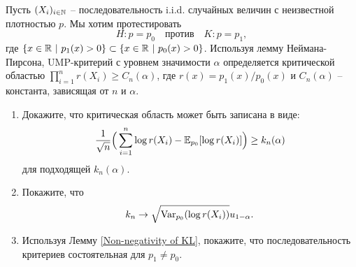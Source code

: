 \begin{exc}
	Пусть $(X_i)_{i \in \mathbb{N}}$ -- последовательность i.i.d. случайных величин с неизвестной плотностью $p$. Мы хотим протестировать
    \[ H:p = p_0 \quad \text{против} \quad K: p = p_1, \]
    где $\{x\in \mathbb{R}\ |\ p_1(x) > 0 \} \subset \{x \in \mathbb{R}\ |\ p_0(x) > 0 \} $. Используя лемму Неймана-Пирсона, UMP-критерий с уровнем значимости $\alpha$ определяется критической областью $\prod_{i=1}^n r(X_i) \geq C_n(\alpha)$, где $r(x) = p_1(x) / p_0(x)$ и $C_n(\alpha)$ -- константа, зависящая от $n$ и $\alpha$.
    \begin{enumerate}
        \item Докажите, что критическая область может быть записана в виде:
        \[ \frac{1}{\sqrt{n}}\Big( \sum_{i=1}^{n} \log r(X_i) - \mathbb{E}_{p_0}[\log r(X_i)] \Big) \geq k_n(\alpha)  \]
        для подходящей $k_n(\alpha)$.
        \item Покажите, что
        \[ k_n \rightarrow \sqrt{\mathrm{Var}_{p_0}(\log r(X_i))}u_{1-\alpha}.  \]
        \item Используя Лемму \ref{Non-negativity of KL}, покажите, что последовательность критериев состоятельная для $p_1 \neq p_0$.
    \end{enumerate} 
\end{exc}

